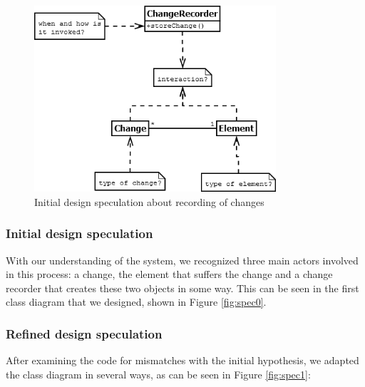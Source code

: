 \documentclass[a4paper]{article}
\begin{document}
\begin{figure}[h]
\centering
\includegraphics[width=0.8\textwidth]{Images/spec0}
\caption{Initial design speculation about recording of changes}
\label{fig:skim}
\end{figure}

\subsubsection{Initial design speculation}
With our understanding of the system, we recognized three main actors involved in this process: a change, the element that suffers the change and a change recorder that creates these two objects in some way. This can be seen in the first class diagram that we designed, shown in Figure \ref{fig:spec0}.

\subsubsection{Refined design speculation}
After examining the code for mismatches with the initial hypothesis, we adapted the class diagram in several ways, as can be seen in Figure \ref{fig:spec1}:
\end{document}

